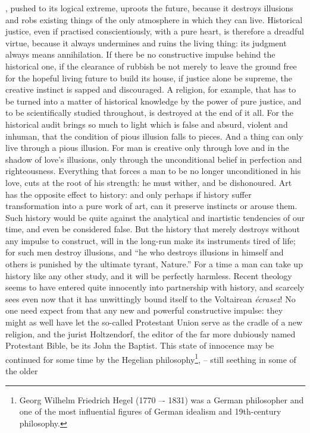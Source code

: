 , pushed to its logical extreme,
uproots the future, because it destroys illusions and robs existing
things of the only atmosphere in which they can live. Historical
justice, even if practised conscientiously, with a pure heart, is
therefore a dreadful virtue, because it always undermines and ruins
the living thing: its judgment always means annihilation. If there be
no constructive impulse behind the historical one, if the clearance
of rubbish be not merely to leave the ground free for the hopeful
living future to build its house, if justice alone be supreme, the
creative instinct is sapped and discouraged. A religion, for example,
that has to be turned into a matter of historical knowledge by the
power of pure justice, and to be scientifically studied throughout,
is destroyed at the end of it all. For the historical audit brings so
much to light which is false and absurd, violent and inhuman, that
the condition of pious illusion falls to pieces. And a thing can only
live through a pious illusion. For man is creative only through love
and in the shadow of love's illusions, only through the unconditional
belief in perfection and righteousness. Everything that forces a man
to be no longer unconditioned in his love, cuts at the root of his
strength: he must wither, and be dishonoured. Art has the opposite
effect to history: and only perhaps if history suffer transformation
into a pure work of art, can it preserve instincts or arouse them.
Such history would be quite against the analytical and inartistic
tendencies of our time, and even be considered false. But the history
that merely destroys without any impulse to construct, will in the
long-run make its instruments tired of life; for such men destroy
illusions, and \enquote{he who destroys illusions in himself and others is
punished by the ultimate tyrant, Nature.} For a time a man can take
up history like any other study, and it will be perfectly harmless.
Recent theology seems to have entered quite innocently into
partnership with history, and scarcely sees even now that it has
unwittingly bound itself to the Voltairean \textit{écrasez}! No one need
expect from that any new and powerful constructive impulse: they
might as well have let the so-called Protestant Union serve as the
cradle of a new religion, and the jurist Holtzendorf, the editor of
the far more dubiously named Protestant Bible, be its John the
Baptist. This state of innocence may be continued for some time by
the Hegelian philosophy\footnote{Georg Wilhelm Friedrich Hegel (1770 –- 1831) was a German philosopher and one of the most influential figures of German idealism and 19th-century philosophy.}, -- still seething in some of the older
